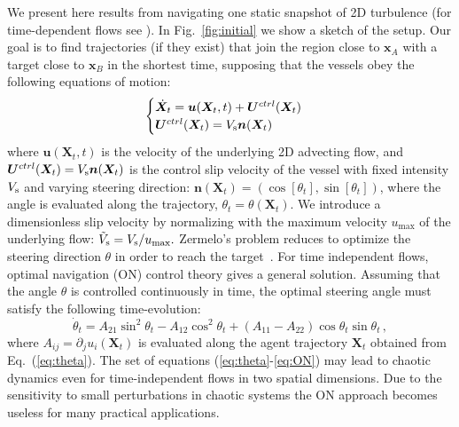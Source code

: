 \documentclass[
]{ceurart}
\newcommand{\bn}{\boldsymbol{n}}
\newcommand{\bx}{\boldsymbol{x}}
\newcommand{\ve}[1]{\ensuremath{\boldsymbol{#1}}}
\begin{document}
We present here results from navigating one static snapshot of 2D turbulence (for time-dependent flows see \cite{biferale2019zermelo}).  In
Fig.~\ref{fig:initial} we show a sketch of the setup. Our goal is to find trajectories (if they
exist) that join the region close to $\bx_{A}$ with a
target close to $\bx_{B}$ in the shortest time, supposing that the vessels obey
the following equations of motion:
\begin{equation}
\begin{cases}
  \dot {\ve X}_t  = {{\ve u}({\ve X}_t,t)} + {\ve U}^{ctrl}({\ve X}_t) \\
  {\ve U}^{ctrl}({\ve X}_t) = V_{\rm s} {\bn}({\ve X}_t)
\label{eq:theta}
\end{cases}
\end{equation}
where {${\ve u}({\ve X}_t,t)$} is the velocity of the underlying 2D
advecting flow, and ${\ve U}^{ctrl}({\ve X}_t) = V_{\rm s}{\bn}({\ve X}_t)$ is the control slip
velocity of the vessel with fixed intensity $V_{\rm s}$ and varying
steering direction:
 ${\bn} ({\ve X}_t) = ( \cos[\theta_t], \sin[\theta_t] )$,
where the angle is evaluated along the trajectory, $\theta_t = \theta({\ve X}_t)$.
We introduce a dimensionless slip velocity by normalizing with the maximum velocity $u_{\max}$ of the underlying flow: $\tilde{V}_{\rm s} = V_{\rm s}/u_{\max}.$ Zermelo's problem reduces to optimize the steering direction  $\theta$ in order to reach the target~\cite{zermelo1931}. For time independent flows, optimal navigation (ON)  control theory gives a general solution\cite{techy2011optimal,mannarini2016visir}. Assuming that
the angle $\theta$ is controlled continuously in time, the optimal steering
angle must satisfy the following time-evolution:
\begin{equation}
\dot \theta_t = A_{21}\sin^2\theta_t - A_{12}\cos^2\theta_t + (A_{11} -
A_{22})\cos\theta_t \sin\theta_t\,, \label{eq:ON}
\end{equation}
where $A_{ij}=\partial_ju_i(\ve X_t)$ is evaluated along the agent
trajectory $\ve X_t$ obtained from Eq.~(\ref{eq:theta}). The set of equations (\ref{eq:theta}-\ref{eq:ON}) may lead to chaotic dynamics even for time-independent flows in two spatial dimensions. Due to the sensitivity to small perturbations in chaotic systems the ON approach becomes useless for many practical applications.
\end{document}

